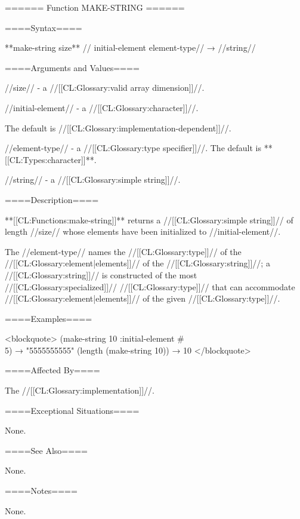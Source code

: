 ====== Function MAKE-STRING ======

====Syntax====

**make-string {size** //\key} initial-element element-type// → //string//

====Arguments and Values====

//size// - a //[[CL:Glossary:valid array dimension]]//.

//initial-element// - a //[[CL:Glossary:character]]//.

The default is //[[CL:Glossary:implementation-dependent]]//.

//element-type// - a //[[CL:Glossary:type specifier]]//. The default is **[[CL:Types:character]]**.

//string// - a //[[CL:Glossary:simple string]]//.

====Description====

**[[CL:Functions:make-string]]** returns a //[[CL:Glossary:simple string]]// of length //size// whose elements have been initialized to //initial-element//.

The //element-type// names the //[[CL:Glossary:type]]// of the //[[CL:Glossary:element|elements]]// of the //[[CL:Glossary:string]]//; a //[[CL:Glossary:string]]// is constructed of the most //[[CL:Glossary:specialized]]// //[[CL:Glossary:type]]// that can accommodate //[[CL:Glossary:element|elements]]// of the given //[[CL:Glossary:type]]//.

====Examples====

<blockquote> (make-string 10 :initial-element #\\5) → "5555555555" (length (make-string 10)) → 10 </blockquote>

====Affected By====

The //[[CL:Glossary:implementation]]//.

====Exceptional Situations====

None.

====See Also====

None.

====Notes====

None.

   
